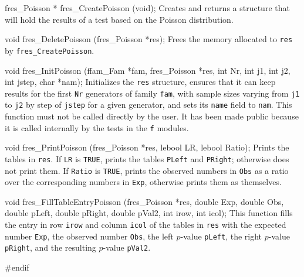 fres_Poisson * fres_CreatePoisson (void);
\endcode
 \tab 
  Creates and returns a structure that will hold the results
  of a test based on the Poisson distribution. 
 \endtab
\code


void fres_DeletePoisson (fres_Poisson *res);
\endcode
 \tab 
  Frees the memory allocated to {\tt res} by {\tt fres\_CreatePoisson}.
 \endtab
\code
\hide

void fres_InitPoisson (ffam_Fam *fam, fres_Poisson *res,
                       int Nr, int j1, int j2, int jstep, char *nam);
\endcode
 \tab 
   Initializes the {\tt res} structure, ensures that it can keep results
   for the first {\tt Nr} generators of family {\tt fam}, with sample sizes
   varying from {\tt j1} to {\tt j2} by step of {\tt jstep} for a given
   generator, and sets its {\tt name} field to {\tt nam}. This function
   must not be called directly by the user. It has been made public because
   it is called internally by the tests in the {\tt f} modules.
 \endtab
\code
\endhide

void fres_PrintPoisson (fres_Poisson *res, lebool LR, lebool Ratio);
\endcode
 \tab Prints the tables in {\tt res}. If {\tt LR} is {\tt TRUE}, prints the
   tables {\tt PLeft} and {\tt PRight}; otherwise does not print them.
   If {\tt Ratio} is {\tt TRUE}, prints the observed numbers in {\tt Obs} as
   a ratio over the corresponding numbers in  {\tt Exp}, otherwise prints
   them as themselves.
 \endtab
\code


void fres_FillTableEntryPoisson (fres_Poisson *res, double Exp, double Obs, 
                                 double pLeft, double pRight, double pVal2,
                                 int irow, int icol);
\endcode
 \tab This function fills the entry in row {\tt irow} and column {\tt icol}
  of the tables in {\tt res} with the expected number {\tt Exp},
  the observed number {\tt Obs}, the left $p$-value {\tt pLeft}, 
  the right $p$-value {\tt pRight}, and the resulting
  $p$-value {\tt pVal2}.
 \endtab

\code
\hide
#endif
\endhide
\endcode
